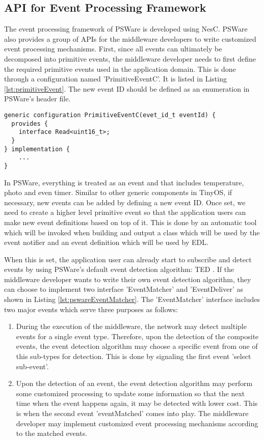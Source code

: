 \subsection{API for Event Processing Framework}
The event processing framework of PSWare is developed using NesC. PSWare also provides a group of APIs for the middleware developers to write customized event processing mechanisms. First, since all events can ultimately be decomposed into primitive events, the middleware developer needs to first define the required primitive events used in the application domain. This is done through a configuration named 'PrimitiveEventC'. It is listed in Listing \ref{lst:primitiveEvent}. The new event ID should be defined as an enumeration in PSWare's header file.
\begin{lstlisting}[caption=Primitive event component in NesC, label=lst:primitiveEvent]
generic configuration PrimitiveEventC(evet_id_t eventId) {
  provides {
    interface Read<uint16_t>;
  }
} implementation {
	...
}
\end{lstlisting}

In PSWare, everything is treated as an event and that includes temperature, photo and even timer. Similar to other generic components in TinyOS, if necessary, new events can be added by defining a new event ID. Once set, we need to create a higher level primitive event so that the application users can make new event definitions based on top of it. This is done by an automatic tool which will be invoked when building and output a class which will be used by the event notifier and an event definition which will be used by EDL.

When this is set, the application user can already start to subscribe and detect events by using PSWare's default event detection algorithm: TED \cite{lai:ted}. If the middleware developer wants to write their own event detection algorithm, they can choose to implement two interface 'EventMatcher' and 'EventDeliver' as shown in Listing \ref{lst:pswareEventMatcher}. The 'EventMatcher' interface includes two major events which serve three purposes as follows:
\begin{enumerate}
\item During the execution of the middleware, the network may detect multiple events for a single event type. Therefore, upon the detection of the composite events, the event detection algorithm may choose a specific event from one of this sub-types for detection. This is done by signaling the first event 'select sub-event'.
\item Upon the detection of an event, the event detection algorithm may perform some customized processing to update some information so that the next time when the event happens again, it may be detected with lower cost. This is when the second event 'eventMatched' comes into play. The middleware developer may implement customized event processing mechanisms according to the matched events.
\end{enumerate}

